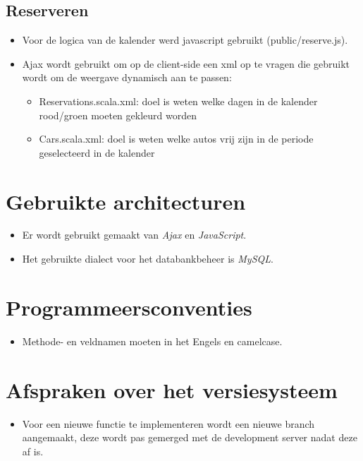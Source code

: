 \documentclass[11pt,a4paper,oneside]{article}
\begin{document}
\subsection{Reserveren}
\begin{itemize}
\item Voor de logica van de kalender werd javascript gebruikt (public/reserve.js).
\item Ajax wordt gebruikt om op de client-side een xml op te vragen die gebruikt wordt om de weergave dynamisch aan te passen:
\begin{itemize}
\item Reservations.scala.xml: doel is weten welke dagen in de kalender rood/groen moeten gekleurd worden
\item Cars.scala.xml: doel is weten welke autos vrij zijn in de periode geselecteerd in de kalender
\end{itemize}
\end{itemize}


\section{Gebruikte architecturen}
\begin{itemize}
        \item Er wordt gebruikt gemaakt van \emph{Ajax} en \emph{JavaScript}.
        \item Het gebruikte dialect voor het databankbeheer is \emph{MySQL}.
\end{itemize}
 
\section{Programmeersconventies}
\begin{itemize}
        \item Methode- en veldnamen moeten in het Engels en camelcase.
\end{itemize}
 
\section{Afspraken over het versiesysteem}
\begin{itemize}
        \item Voor een nieuwe functie te implementeren wordt een nieuwe branch aangemaakt, deze wordt pas gemerged met de development server nadat deze af is.
\end{itemize}
 
\end{document}
